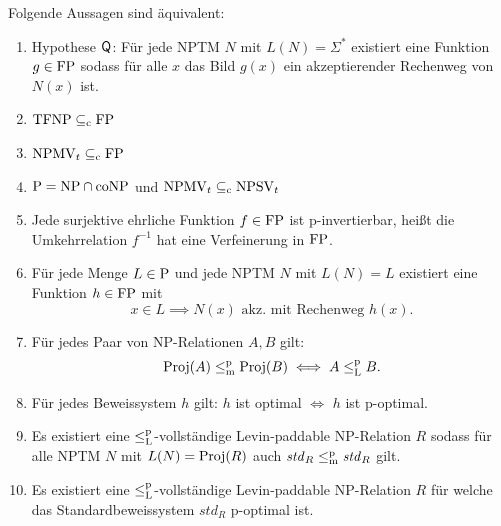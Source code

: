 \begin{theorem}\label{thm:q}
    Folgende Aussagen sind äquivalent:
    \begin{enumerate}
        \item Hypothese $\hQ$: Für jede NPTM $N$ mit $L(N)=\Sigma^*$ existiert eine Funktion $g\in\FP$ sodass für alle $x$ das Bild $g(x)$ ein akzeptierender Rechenweg von $N(x)$ ist.
        \item $\TFNP\subseteqc \FP$
        \item $\mathrm{NPMV}_t\subseteqc \FP$
        \item $\P=\NP\cap\coNP$ und $\mathrm{NPMV}_t\subseteqc \mathrm{NPSV}_t$
        \item Jede surjektive ehrliche Funktion $f\in\FP$ ist p-invertierbar, heißt die Umkehrrelation $f^{-1}$ hat eine Verfeinerung in $\FP$. 
        \item Für jede Menge $L\in \P$  und jede NPTM $N$ mit $L(N)=L$ existiert eine Funktion $h\in \FP$ mit 
            \[ x\in L \implies N(x) \text{ akz. mit Rechenweg $h(x)$}. \]
        \item Für jedes Paar von NP-Relationen $A, B$ gilt:
            \[ \Proj(A) \leqmp \Proj(B) \iff A \leqlp B. \]
        \item Für jedes Beweissystem $h$ gilt: $h$ ist optimal $\iff$ $h$ ist p-optimal. 
        \item Es existiert eine $\leqlp$-vollständige Levin-paddable NP-Relation $R$ sodass für alle NPTM $N$ mit $L(N)=\Proj(R)$ auch $\mathit{std}_R\leqmp \mathit{std}_R$ gilt.
        \item Es existiert eine $\leqlp$-vollständige Levin-paddable NP-Relation $R$ für welche das Standardbeweissystem $\mathit{std}_R$ p-optimal ist.
    \end{enumerate}
\end{theorem}
